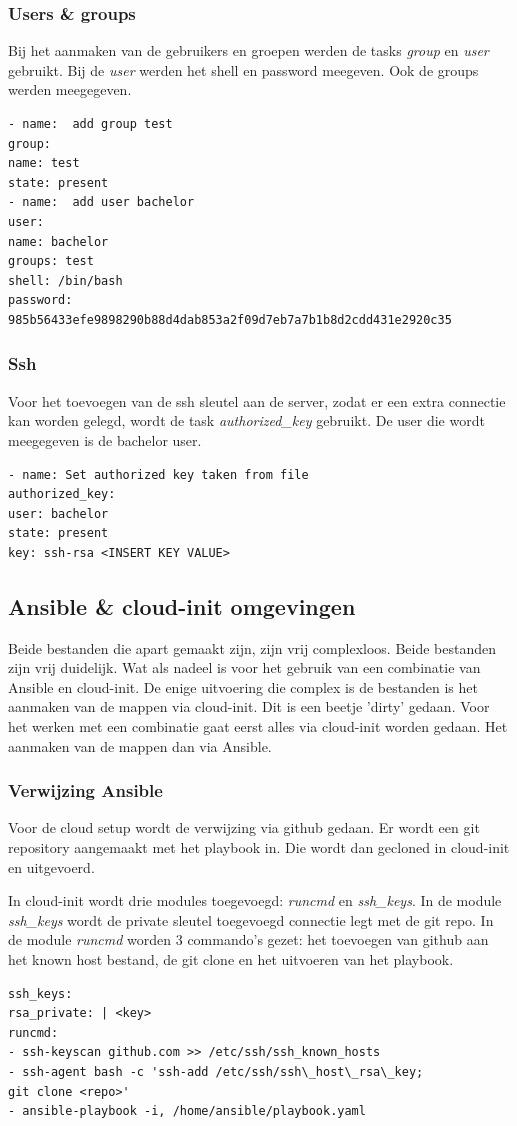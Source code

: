 \subsubsection{Users \& groups}
Bij het aanmaken van de gebruikers en groepen werden de tasks \textit{group} en \textit{user} gebruikt. Bij de \textit{user} werden het shell en password meegeven. Ook de groups werden meegegeven.
\begin{lstlisting}[basicstyle=\small]
- name:  add group test
group:
name: test
state: present
- name:  add user bachelor
user:
name: bachelor
groups: test
shell: /bin/bash
password: 985b56433efe9898290b88d4dab853a2f09d7eb7a7b1b8d2cdd431e2920c35
\end{lstlisting}

\subsubsection{Ssh}
Voor het toevoegen van de ssh sleutel aan de server, zodat er een extra connectie kan worden gelegd, wordt de task \textit{authorized\_key} gebruikt. De user die wordt meegegeven is de bachelor user.
\begin{lstlisting}[basicstyle=\small]
- name: Set authorized key taken from file
authorized_key:
user: bachelor
state: present
key: ssh-rsa <INSERT KEY VALUE>

\end{lstlisting}

\subsection{Ansible \& cloud-init omgevingen}
Beide bestanden die apart gemaakt zijn, zijn vrij complexloos. Beide bestanden zijn vrij duidelijk. Wat als nadeel is voor het gebruik van een combinatie van Ansible en cloud-init. De enige uitvoering die complex is de bestanden is het aanmaken van de mappen via cloud-init. Dit is een beetje 'dirty' gedaan. Voor het werken met een combinatie gaat eerst alles via cloud-init worden gedaan. Het aanmaken van de mappen dan via Ansible.

\subsubsection{Verwijzing Ansible}
Voor de cloud setup wordt de verwijzing via github gedaan. Er wordt een git repository aangemaakt met het playbook in. Die wordt dan gecloned in cloud-init en uitgevoerd.

In cloud-init wordt drie modules toegevoegd: \textit{runcmd} en \textit{ssh\_keys}. In de module \textit{ssh\_keys} wordt de private sleutel toegevoegd connectie legt met de git repo. In de module \textit{runcmd} worden 3 commando's gezet: het toevoegen van github aan het known host bestand, de git clone en het uitvoeren van het playbook. 
\begin{lstlisting}[basicstyle=\small]
ssh_keys:
rsa_private: | <key>
runcmd:
- ssh-keyscan github.com >> /etc/ssh/ssh_known_hosts
- ssh-agent bash -c 'ssh-add /etc/ssh/ssh\_host\_rsa\_key; 
git clone <repo>'
- ansible-playbook -i, /home/ansible/playbook.yaml
\end{lstlisting}

